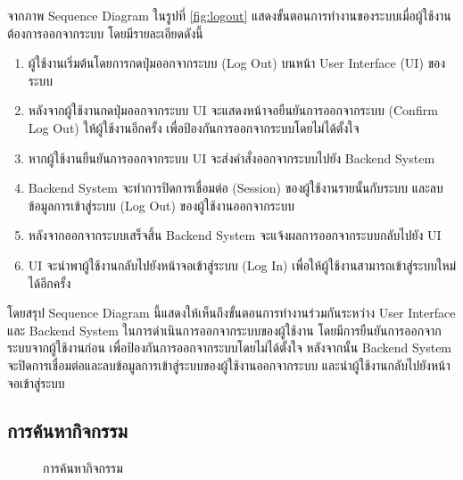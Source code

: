 \documentclass[14pt,oneside,openright,a4paper]{cpe-thai-project}
\begin{document}
  จากภาพ Sequence Diagram ในรูปที่ \ref{fig:logout} แสดงขั้นตอนการทำงานของระบบเมื่อผู้ใช้งานต้องการออกจากระบบ โดยมีรายละเอียดดังนี้
  \begin{enumerate}
    \item ผู้ใช้งานเริ่มต้นโดยการกดปุ่มออกจากระบบ (Log Out) บนหน้า User Interface (UI) ของระบบ
    \item หลังจากผู้ใช้งานกดปุ่มออกจากระบบ UI จะแสดงหน้าจอยืนยันการออกจากระบบ (Confirm Log Out) ให้ผู้ใช้งานอีกครั้ง เพื่อป้องกันการออกจากระบบโดยไม่ได้ตั้งใจ
    \item หากผู้ใช้งานยืนยันการออกจากระบบ UI จะส่งคำสั่งออกจากระบบไปยัง Backend System
    \item Backend System จะทำการปิดการเชื่อมต่อ (Session) ของผู้ใช้งานรายนั้นกับระบบ และลบข้อมูลการเข้าสู่ระบบ (Log Out) ของผู้ใช้งานออกจากระบบ
    \item หลังจากออกจากระบบเสร็จสิ้น Backend System จะแจ้งผลการออกจากระบบกลับไปยัง UI
    \item UI จะนำพาผู้ใช้งานกลับไปยังหน้าจอเข้าสู่ระบบ (Log In) เพื่อให้ผู้ใช้งานสามารถเข้าสู่ระบบใหม่ได้อีกครั้ง
  \end{enumerate}
  โดยสรุป Sequence Diagram นี้แสดงให้เห็นถึงขั้นตอนการทำงานร่วมกันระหว่าง User Interface และ Backend System ในการดำเนินการออกจากระบบของผู้ใช้งาน โดยมีการยืนยันการออกจากระบบจากผู้ใช้งานก่อน เพื่อป้องกันการออกจากระบบโดยไม่ได้ตั้งใจ หลังจากนั้น Backend System จะปิดการเชื่อมต่อและลบข้อมูลการเข้าสู่ระบบของผู้ใช้งานออกจากระบบ และนำผู้ใช้งานกลับไปยังหน้าจอเข้าสู่ระบบ

\newpage

\subsection{การค้นหากิจกรรม}

  \begin{figure}[!h]\centering
    \setlength{\fboxrule}{0.5mm} %
    \setlength{\fboxsep}{0.5cm}
    \caption{การค้นหากิจกรรม}\label{fig:Search Event}
  \end{figure}
\end{document}
